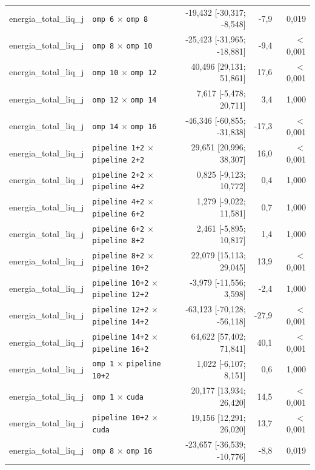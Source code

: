\begin{tabular}{llrrr}
energia\_total\_liq\_j & \texttt{omp 6} $\times$ \texttt{omp 8} & -19,432 [-30,317; -8,548] & -7,9 & 0,019 \\
energia\_total\_liq\_j & \texttt{omp 8} $\times$ \texttt{omp 10} & -25,423 [-31,965; -18,881] & -9,4 & $<$0,001 \\
energia\_total\_liq\_j & \texttt{omp 10} $\times$ \texttt{omp 12} & 40,496 [29,131; 51,861] & 17,6 & $<$0,001 \\
energia\_total\_liq\_j & \texttt{omp 12} $\times$ \texttt{omp 14} & 7,617 [-5,478; 20,711] & 3,4 & 1,000 \\
energia\_total\_liq\_j & \texttt{omp 14} $\times$ \texttt{omp 16} & -46,346 [-60,855; -31,838] & -17,3 & $<$0,001 \\
energia\_total\_liq\_j & \texttt{pipeline 1+2} $\times$ \texttt{pipeline 2+2} & 29,651 [20,996; 38,307] & 16,0 & $<$0,001 \\
energia\_total\_liq\_j & \texttt{pipeline 2+2} $\times$ \texttt{pipeline 4+2} & 0,825 [-9,123; 10,772] & 0,4 & 1,000 \\
energia\_total\_liq\_j & \texttt{pipeline 4+2} $\times$ \texttt{pipeline 6+2} & 1,279 [-9,022; 11,581] & 0,7 & 1,000 \\
energia\_total\_liq\_j & \texttt{pipeline 6+2} $\times$ \texttt{pipeline 8+2} & 2,461 [-5,895; 10,817] & 1,4 & 1,000 \\
energia\_total\_liq\_j & \texttt{pipeline 8+2} $\times$ \texttt{pipeline 10+2} & 22,079 [15,113; 29,045] & 13,9 & $<$0,001 \\
energia\_total\_liq\_j & \texttt{pipeline 10+2} $\times$ \texttt{pipeline 12+2} & -3,979 [-11,556; 3,598] & -2,4 & 1,000 \\
energia\_total\_liq\_j & \texttt{pipeline 12+2} $\times$ \texttt{pipeline 14+2} & -63,123 [-70,128; -56,118] & -27,9 & $<$0,001 \\
energia\_total\_liq\_j & \texttt{pipeline 14+2} $\times$ \texttt{pipeline 16+2} & 64,622 [57,402; 71,841] & 40,1 & $<$0,001 \\
energia\_total\_liq\_j & \texttt{omp 1} $\times$ \texttt{pipeline 10+2} & 1,022 [-6,107; 8,151] & 0,6 & 1,000 \\
energia\_total\_liq\_j & \texttt{omp 1} $\times$ \texttt{cuda} & 20,177 [13,934; 26,420] & 14,5 & $<$0,001 \\
energia\_total\_liq\_j & \texttt{pipeline 10+2} $\times$ \texttt{cuda} & 19,156 [12,291; 26,020] & 13,7 & $<$0,001 \\
energia\_total\_liq\_j & \texttt{omp 8} $\times$ \texttt{omp 16} & -23,657 [-36,539; -10,776] & -8,8 & 0,019 \\

\end{tabular}
